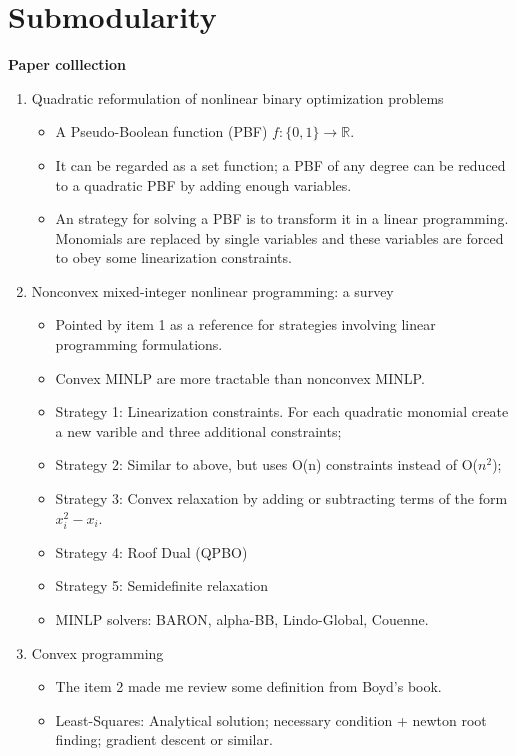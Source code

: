 \chapter{Submodularity}\label{chapter:submodularity}

\textbf{Paper colllection}
\begin{enumerate}
	\item{Quadratic reformulation of nonlinear binary optimization problems}
	\begin{itemize}
		\item{A Pseudo-Boolean function (PBF) $f:\{0,1\}\rightarrow \mathbb{R}$.}
		\item{It can be regarded as a set function; a PBF of any degree can be reduced to a quadratic PBF by adding enough variables.}
		\item{An strategy for solving a PBF is to transform it in a linear programming. Monomials are replaced by single variables and these variables are forced to obey some linearization constraints. }
	\end{itemize}
	\item{Nonconvex mixed-integer nonlinear programming: a survey}
	\begin{itemize}
		\item{Pointed by item 1 as a reference for strategies involving linear programming formulations.}
		\item{Convex MINLP are more tractable than nonconvex MINLP.}
		\item{Strategy 1: Linearization constraints. For each quadratic monomial create a new varible and three additional constraints;}
		\item{Strategy 2: Similar to above, but uses O(n) constraints instead of O($n^2$);}
		\item{Strategy 3: Convex relaxation by adding or subtracting terms of the form $x_i^2-x_i$.}
		\item{Strategy 4: Roof Dual (QPBO) }
		\item{Strategy 5: Semidefinite relaxation}
		\item{MINLP solvers: BARON, alpha-BB, Lindo-Global, Couenne.}
	\end{itemize}
	\item{Convex programming}
	\begin{itemize}
		\item{The item 2 made me review some definition from Boyd's book.}
		\item{Least-Squares: Analytical solution; necessary condition + newton root finding; gradient descent or similar.}

\end{itemize}
\end{enumerate}
